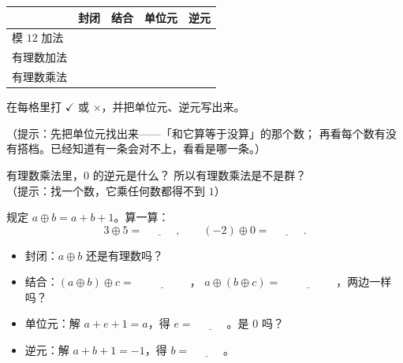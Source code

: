 \begin{example}[先看三个老熟人]
  \begin{center}
  \begin{tabular}{@{}lcccc@{}}
    \toprule
     & 封闭 & 结合 & 单位元 & 逆元 \\
    \midrule
    模 \(12\) 加法 & & & & \\
    有理数加法 & & & & \\
    有理数乘法 & & & & \\
    \bottomrule
  \end{tabular}
  \end{center}
  在每格里打 \(\checkmark\) 或 \(\times\)，并把单位元、逆元写出来。

  （提示：先把单位元找出来——「和它算等于没算」的那个数；
  再看每个数有没有搭档。已经知道有一条会对不上，看看是哪一条。）
\end{example}

\begin{sikao}
  有理数乘法里，\(0\) 的逆元是什么？
  所以有理数乘法是不是群？\underline{\hspace{4em}}
  \\[4pt]
  （提示：找一个数，它乘任何数都得不到 \(1\)）
\end{sikao}

\begin{example}[自己定制一个运算]
  规定 \(a\oplus b=a+b+1\)。算一算：
  \[
    3\oplus5=\underline{\hspace{3em}}, \qquad (-2)\oplus0=\underline{\hspace{3em}} .
  \]
\end{example}

\begin{dongshou}[一条一条验]
  \begin{itemize}
    \item 封闭：\(a\oplus b\) 还是有理数吗？
    \item 结合：\((a\oplus b)\oplus c=\underline{\hspace{5em}}\)，
      \(a\oplus(b\oplus c)=\underline{\hspace{5em}}\)，两边一样吗？
    \item 单位元：解 \(a+e+1=a\)，得 \(e=\underline{\hspace{3em}}\)。是 \(0\) 吗？
    \item 逆元：解 \(a+b+1=-1\)，得 \(b=\underline{\hspace{3em}}\)。
  \end{itemize}
\end{dongshou}

